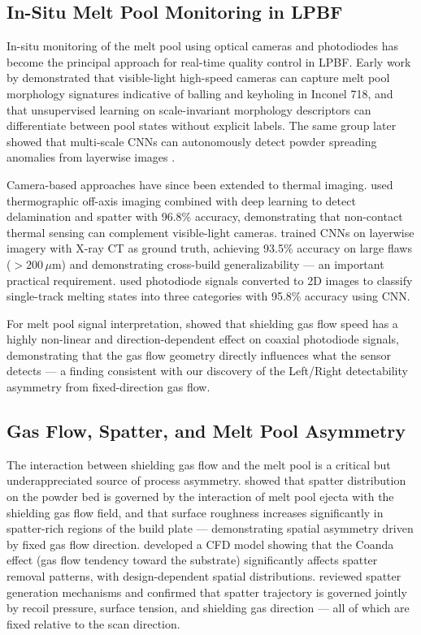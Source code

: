 \subsection{In-Situ Melt Pool Monitoring in LPBF}

In-situ monitoring of the melt pool using optical cameras and
photodiodes has become the principal approach for real-time
quality control in LPBF. Early work by
\citet{scime2018using} demonstrated that visible-light high-speed
cameras can capture melt pool morphology signatures indicative
of balling and keyholing in Inconel 718, and that unsupervised
learning on scale-invariant morphology descriptors can
differentiate between pool states without explicit labels.
The same group later showed that multi-scale CNNs can
autonomously detect powder spreading anomalies from layerwise
images \citep{scime2018multiscale}.

Camera-based approaches have since been extended to thermal
imaging. \citet{baumgartl2020deep} used thermographic off-axis
imaging combined with deep learning to detect delamination and
spatter with 96.8\% accuracy, demonstrating that non-contact
thermal sensing can complement visible-light cameras.
\citet{snow2021toward} trained CNNs on layerwise imagery with
X-ray CT as ground truth, achieving 93.5\% accuracy on large
flaws ($> 200\,\mu$m) and demonstrating cross-build
generalizability — an important practical requirement.
\citet{cao2023monitoring} used photodiode signals converted
to 2D images to classify single-track melting states into
three categories with 95.8\% accuracy using CNN.

For melt pool signal interpretation, \citet{reijonen2024effect}
showed that shielding gas flow speed has a highly non-linear
and direction-dependent effect on coaxial photodiode signals,
demonstrating that the gas flow geometry directly influences
what the sensor detects — a finding consistent with our
discovery of the Left/Right detectability asymmetry from
fixed-direction gas flow.

\subsection{Gas Flow, Spatter, and Melt Pool Asymmetry}

The interaction between shielding gas flow and the melt pool
is a critical but underappreciated source of process asymmetry.
\citet{esmaeilizadeh2018spatter} showed that spatter distribution
on the powder bed is governed by the interaction of melt pool
ejecta with the shielding gas flow field, and that surface
roughness increases significantly in spatter-rich regions of
the build plate — demonstrating spatial asymmetry driven by
fixed gas flow direction. \citet{zhang2020simulation} developed
a CFD model showing that the Coanda effect (gas flow tendency
toward the substrate) significantly affects spatter removal
patterns, with design-dependent spatial distributions.
\citet{li2022review} reviewed spatter generation mechanisms
and confirmed that spatter trajectory is governed jointly by
recoil pressure, surface tension, and shielding gas direction
— all of which are fixed relative to the scan direction.

